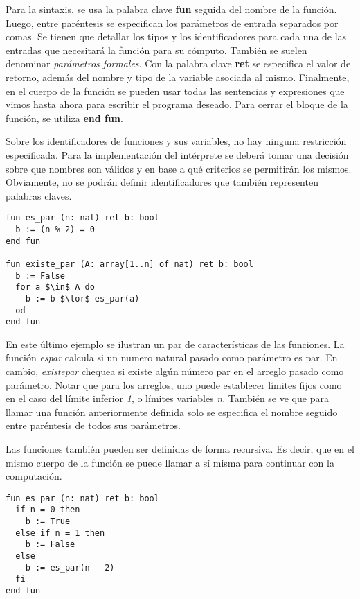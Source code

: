 \documentclass{article}
\begin{document}
Para la sintaxis, se usa la palabra clave \textbf{fun} seguida del nombre de la función.
Luego, entre paréntesis se especifican los parámetros de entrada separados por comas.
Se tienen que detallar los tipos y los identificadores para cada una de las entradas que necesitará la función para su cómputo.
También se suelen denominar \textit{parámetros formales}.
Con la palabra clave \textbf{ret} se especifica el valor de retorno, además del nombre y tipo de la variable asociada al mismo.
Finalmente, en el cuerpo de la función se pueden usar todas las sentencias y expresiones que vimos hasta ahora para escribir el programa deseado.
Para cerrar el bloque de la función, se utiliza \textbf{end fun}.

Sobre los identificadores de funciones y sus variables, no hay ninguna restricción especificada.
Para la implementación del intérprete se deberá tomar una decisión sobre que nombres son válidos y en base a qué criterios se permitirán los mismos.
Obviamente, no se podrán definir identificadores que también representen palabras claves.

\begin{lstlisting}
fun es_par (n: nat) ret b: bool
  b := (n % 2) = 0
end fun

fun existe_par (A: array[1..n] of nat) ret b: bool
  b := False
  for a $\in$ A do
    b := b $\lor$ es_par(a)
  od
end fun
\end{lstlisting}

En este último ejemplo se ilustran un par de características de las funciones.
La función \textit{es\gbajo par} calcula si un numero natural pasado como parámetro es par.
En cambio, \textit{existe\gbajo par} chequea si existe algún número par en el arreglo pasado como parámetro.
Notar que para los arreglos, uno puede establecer límites fijos como en el caso del límite inferior \textit{1}, o límites variables \textit{n}.
También se ve que para llamar una función anteriormente definida solo se especifica el nombre seguido entre paréntesis de todos sus parámetros.

Las funciones también pueden ser definidas de forma recursiva.
Es decir, que en el mismo cuerpo de la función se puede llamar a sí misma para continuar con la computación.

\begin{lstlisting}
fun es_par (n: nat) ret b: bool
  if n = 0 then
    b := True
  else if n = 1 then
    b := False
  else
    b := es_par(n - 2)
  fi
end fun
\end{lstlisting}
\end{document}
